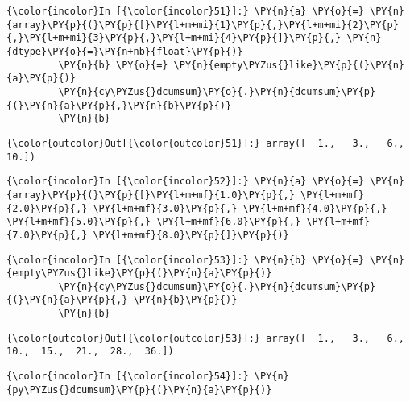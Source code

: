     \begin{Verbatim}[commandchars=\\\{\}]
{\color{incolor}In [{\color{incolor}51}]:} \PY{n}{a} \PY{o}{=} \PY{n}{array}\PY{p}{(}\PY{p}{[}\PY{l+m+mi}{1}\PY{p}{,}\PY{l+m+mi}{2}\PY{p}{,}\PY{l+m+mi}{3}\PY{p}{,}\PY{l+m+mi}{4}\PY{p}{]}\PY{p}{,} \PY{n}{dtype}\PY{o}{=}\PY{n+nb}{float}\PY{p}{)}
         \PY{n}{b} \PY{o}{=} \PY{n}{empty\PYZus{}like}\PY{p}{(}\PY{n}{a}\PY{p}{)}
         \PY{n}{cy\PYZus{}dcumsum}\PY{o}{.}\PY{n}{dcumsum}\PY{p}{(}\PY{n}{a}\PY{p}{,}\PY{n}{b}\PY{p}{)}
         \PY{n}{b}
\end{Verbatim}

            \begin{Verbatim}[commandchars=\\\{\}]
{\color{outcolor}Out[{\color{outcolor}51}]:} array([  1.,   3.,   6.,  10.])
\end{Verbatim}
        
    \begin{Verbatim}[commandchars=\\\{\}]
{\color{incolor}In [{\color{incolor}52}]:} \PY{n}{a} \PY{o}{=} \PY{n}{array}\PY{p}{(}\PY{p}{[}\PY{l+m+mf}{1.0}\PY{p}{,} \PY{l+m+mf}{2.0}\PY{p}{,} \PY{l+m+mf}{3.0}\PY{p}{,} \PY{l+m+mf}{4.0}\PY{p}{,} \PY{l+m+mf}{5.0}\PY{p}{,} \PY{l+m+mf}{6.0}\PY{p}{,} \PY{l+m+mf}{7.0}\PY{p}{,} \PY{l+m+mf}{8.0}\PY{p}{]}\PY{p}{)}
\end{Verbatim}

    \begin{Verbatim}[commandchars=\\\{\}]
{\color{incolor}In [{\color{incolor}53}]:} \PY{n}{b} \PY{o}{=} \PY{n}{empty\PYZus{}like}\PY{p}{(}\PY{n}{a}\PY{p}{)}
         \PY{n}{cy\PYZus{}dcumsum}\PY{o}{.}\PY{n}{dcumsum}\PY{p}{(}\PY{n}{a}\PY{p}{,} \PY{n}{b}\PY{p}{)}
         \PY{n}{b}
\end{Verbatim}

            \begin{Verbatim}[commandchars=\\\{\}]
{\color{outcolor}Out[{\color{outcolor}53}]:} array([  1.,   3.,   6.,  10.,  15.,  21.,  28.,  36.])
\end{Verbatim}
        
    \begin{Verbatim}[commandchars=\\\{\}]
{\color{incolor}In [{\color{incolor}54}]:} \PY{n}{py\PYZus{}dcumsum}\PY{p}{(}\PY{n}{a}\PY{p}{)}
\end{Verbatim}

